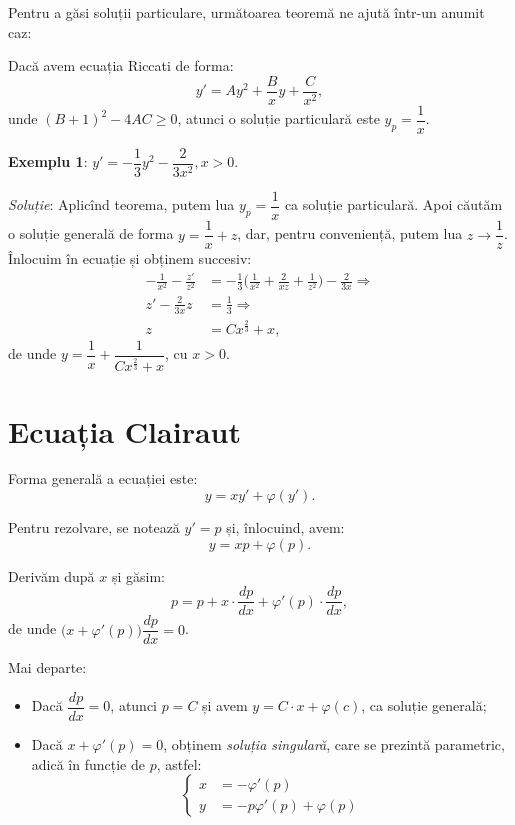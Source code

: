 Pentru a găsi soluții particulare, următoarea teoremă ne ajută într-un anumit caz:

\begin{theorem}\label{thm:ric}
  Dacă avem ecuația Riccati de forma:
  \[
    y' = Ay^2 + \frac{B}{x}y + \frac{C}{x^2},
  \]
  unde $(B + 1)^2 - 4AC \geq 0$, atunci o soluție particulară este $y_p = \dfrac{1}{x}$.
\end{theorem}

\textbf{Exemplu 1}: $y' = -\dfrac{1}{3} y^2 - \dfrac{2}{3x^2}, x > 0$.

\emph{Soluție}: Aplicînd teorema, putem lua $y_p = \dfrac{1}{x}$ ca soluție particulară.
Apoi căutăm o soluție generală de forma $y = \dfrac{1}{x} + z$, dar, pentru conveniență,
putem lua $z \to \dfrac{1}{z}$. Înlocuim în ecuație și obținem succesiv:
\begin{align*}
  -\frac{1}{x^2} - \frac{z'}{z^2} &= -\frac{1}{3} \Big( \frac{1}{x^2} + \frac{2}{xz} + \frac{1}{z^2} \Big) - \frac{2}{3x} \Rightarrow \\
  z' - \frac{2}{3x} z &= \frac{1}{3} \Rightarrow \\
  z &= Cx^{\frac{2}{3}} + x,
\end{align*}
de unde $y = \dfrac{1}{x} + \dfrac{1}{Cx^{\frac{2}{3}} + x}$, cu $x > 0$.


\section{Ecuația Clairaut}
\label{sec:clairaut}

Forma generală a ecuației este:
\[
  y = xy' + \varphi(y').
\]

Pentru rezolvare, se notează $y' = p$ și, înlocuind, avem:
\[
  y = xp + \varphi(p).
\]

Derivăm după $x$ și găsim:
\[
  p = p + x \cdot \frac{dp}{dx} + \varphi'(p) \cdot \frac{dp}{dx},
\]
de unde $\big( x + \varphi'(p) \big) \dfrac{dp}{dx} = 0$.

Mai departe:
\begin{itemize}
\item Dacă $\dfrac{dp}{dx} = 0$, atunci $p = C$ și avem $y = C \cdot x + \varphi(c)$, ca soluție generală;
\item Dacă $x + \varphi'(p) = 0$, obținem \emph{soluția singulară}, care se prezintă parametric, adică
  în funcție de $p$, astfel:
  \[
    \begin{cases}
      x &= -\varphi'(p) \\
      y &= -p\varphi'(p) + \varphi(p)
    \end{cases}
  \]
\end{itemize}

